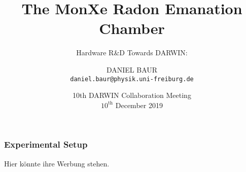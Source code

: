 \documentclass[aspectratio=169]{beamer}
\begin{document}
\title{The MonXe Radon Emanation Chamber}
\subtitle{Hardware R\&D Towards DARWIN:}
\date{10th DARWIN Collaboration Meeting\\ $\text{10}^{\text{th}}$ December 2019}
\author{D{\fontsize{10}{10}\selectfont ANIEL} B{\fontsize{10}{10}\selectfont AUR}\\ \texttt{daniel.baur@physik.uni-freiburg.de}} %
\begin{frame}
\titlepage
\end{frame}


\begin{frame}
\end{frame}


\begin{frame}
    \frametitle{Experimental Setup}
    Hier könnte ihre Werbung stehen.
    \framenumber
\end{frame}
\end{document}
